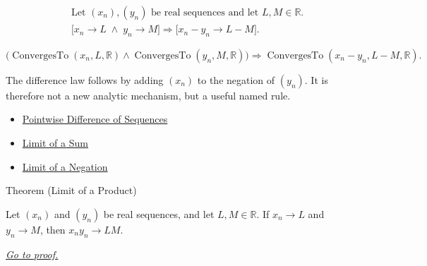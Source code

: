 \begin{remark*}
\[
\begin{aligned}
&\text{Let } (x_n),(y_n) \text{ be real sequences and let } L,M\in\mathbb{R}.\\
&\bigl[
x_n\to L \;\land\; y_n\to M
\bigr]
\Longrightarrow
\bigl[
x_n-y_n\to L-M
\bigr].
\end{aligned}
\]
\end{remark*}

\begin{remark*}
\[
\bigl(
\operatorname{ConvergesTo}(x_n,L,\mathbb{R})
\land
\operatorname{ConvergesTo}(y_n,M,\mathbb{R})
\bigr)
\Longrightarrow
\operatorname{ConvergesTo}(x_n-y_n,L-M,\mathbb{R}).
\]
\end{remark*}

\begin{remark*}[Interpretation]
The difference law follows by adding $(x_n)$ to the negation of $(y_n)$.
It is therefore not a new analytic mechanism, but a useful named rule.
\end{remark*}

\begin{dependencies}
\begin{itemize}
  \item \hyperref[def:pointwise-difference-sequence]{Pointwise Difference of Sequences}
  \item \hyperref[thm:limit-of-a-sum]{Limit of a Sum}
  \item \hyperref[thm:limit-of-a-negation]{Limit of a Negation}
\end{itemize}
\end{dependencies}


\begin{theorembox}{Theorem (Limit of a Product)}
\begin{theorem}
\label{thm:limit-of-a-product}
Let $(x_n)$ and $(y_n)$ be real sequences, and let $L,M\in\mathbb{R}$.
If $x_n\to L$ and $y_n\to M$, then $x_ny_n\to LM$.

\smallskip
\noindent
\hyperref[prf:limit-of-a-product]{\textit{Go to proof.}}
\end{theorem}
\end{theorembox}

